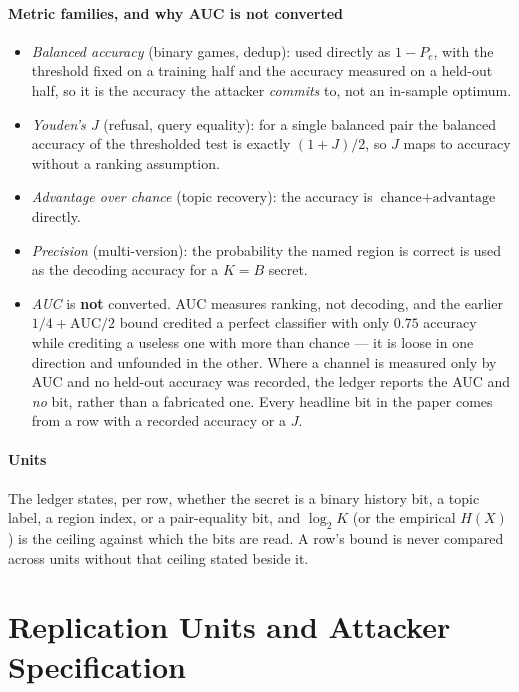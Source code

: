 \documentclass[10pt,journal,compsoc]{IEEEtran}
\begin{document}
\paragraph{Metric families, and why AUC is not converted}
\begin{itemize}
\item \emph{Balanced accuracy} (binary games, dedup): used directly as $1-P_e$, with the threshold
fixed on a training half and the accuracy measured on a held-out half, so it is the accuracy the
attacker \emph{commits} to, not an in-sample optimum.
\item \emph{Youden's $J$} (refusal, query equality): for a single balanced pair the balanced
accuracy of the thresholded test is exactly $(1+J)/2$, so $J$ maps to accuracy without a ranking
assumption.
\item \emph{Advantage over chance} (topic recovery): the accuracy is $\text{chance}+\text{advantage}$
directly.
\item \emph{Precision} (multi-version): the probability the named region is correct is used as the
decoding accuracy for a $K=B$ secret.
\item \emph{AUC} is \textbf{not} converted. AUC measures ranking, not decoding, and the earlier
$1/4+\text{AUC}/2$ bound credited a perfect classifier with only $0.75$ accuracy while crediting a
useless one with more than chance --- it is loose in one direction and unfounded in the other. Where
a channel is measured only by AUC and no held-out accuracy was recorded, the ledger reports the AUC
and \emph{no} bit, rather than a fabricated one. Every headline bit in the paper comes from a row
with a recorded accuracy or a $J$.
\end{itemize}

\paragraph{Units} The ledger states, per row, whether the secret is a binary history bit, a topic
label, a region index, or a pair-equality bit, and $\log_2 K$ (or the empirical $H(X)$) is the
ceiling against which the bits are read. A row's bound is never compared across units without that
ceiling stated beside it.

\section{Replication Units and Attacker Specification}
\label{supp:units}
\end{document}
